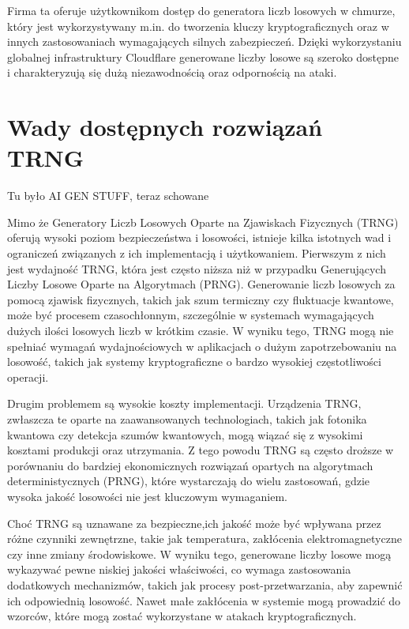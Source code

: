 Firma ta oferuje użytkownikom dostęp do generatora liczb losowych w chmurze, który jest wykorzystywany
m.in. do tworzenia kluczy kryptograficznych oraz w innych zastosowaniach wymagających silnych zabezpieczeń.
Dzięki wykorzystaniu globalnej infrastruktury Cloudflare generowane liczby losowe są
szeroko dostępne i charakteryzują się dużą niezawodnością oraz odpornością na ataki.




\section{Wady dostępnych rozwiązań TRNG}\label{sec:wady-dostepnych-rozwiazan-trng}

Tu było AI GEN STUFF, teraz schowane
\iffalse

Mimo że Generatory Liczb Losowych Oparte na Zjawiskach Fizycznych (TRNG) oferują wysoki poziom bezpieczeństwa i losowości,
istnieje kilka istotnych wad i ograniczeń związanych z ich implementacją i użytkowaniem. Pierwszym z nich jest 
wydajność TRNG, która jest często niższa niż w przypadku Generujących Liczby Losowe Oparte na Algorytmach (PRNG).
Generowanie liczb losowych za pomocą zjawisk fizycznych, takich jak szum termiczny czy fluktuacje kwantowe,
może być procesem czasochłonnym, szczególnie w systemach wymagających dużych ilości losowych liczb w krótkim czasie.
W wyniku tego, TRNG mogą nie spełniać wymagań wydajnościowych w aplikacjach o dużym zapotrzebowaniu na losowość,
takich jak systemy kryptograficzne o bardzo wysokiej częstotliwości operacji.

Drugim problemem są wysokie koszty implementacji.
Urządzenia TRNG, zwłaszcza te oparte na zaawansowanych technologiach,
takich jak fotonika kwantowa czy detekcja szumów kwantowych,
mogą wiązać się z wysokimi kosztami produkcji oraz utrzymania.
Z tego powodu TRNG są często droższe w porównaniu do bardziej ekonomicznych rozwiązań opartych na algorytmach deterministycznych (PRNG),
które wystarczają do wielu zastosowań, gdzie wysoka jakość losowości nie jest kluczowym wymaganiem.


Choć TRNG są uznawane za bezpieczne,ich jakość może być wpływana przez różne czynniki zewnętrzne, takie jak temperatura,
zakłócenia elektromagnetyczne czy inne zmiany środowiskowe.
W wyniku tego, generowane liczby losowe mogą wykazywać pewne niskiej jakości właściwości,
co wymaga zastosowania dodatkowych mechanizmów, takich jak procesy post-przetwarzania, aby zapewnić ich odpowiednią losowość.
Nawet małe zakłócenia w systemie mogą prowadzić do wzorców, które mogą zostać wykorzystane w atakach kryptograficznych.


